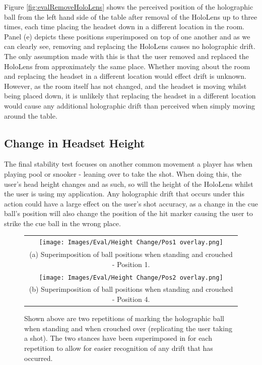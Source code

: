 \documentclass[ %
                author={Finn Alexander Wilkinson},
                supervisor={Dr. Andrew Calway},
                degree={MEng},
                title={\centering A Mixed Reality Aim Assistant for Pool and Snooker},
                subtitle={},
                type={Enterprise},
                year={2021} ]{dissertation}
\begin{document}
Figure \ref{fig:evalRemoveHoloLens} shows the perceived position of the holographic ball from the left hand side of the table after removal of the HoloLens up to three times, each time placing the headset down in a different location in the room. Panel (e) depicts these positions superimposed on top of one another and as we can clearly see, removing and replacing the HoloLens causes no holographic drift. The only assumption made with this is that the user removed and replaced the HoloLens from approximately the same place. Whether moving about the room and replacing the headset in a different location would effect drift is unknown. However, as the room itself has not changed, and the headset is moving whilst being placed down, it is unlikely that replacing the headset in a different location would cause any additional holographic drift than perceived when simply moving around the table.


\subsection{Change in Headset Height}
The final stability test focuses on another common movement a player has when playing pool or snooker - leaning over to take the shot. When doing this, the user's head height changes and as such, so will the height of the HoloLens whilst the user is using my application. Any holographic drift that occurs under this action could have a large effect on the user's shot accuracy, as a change in the cue ball's position will also change the position of the hit marker causing the user to strike the cue ball in the wrong place. 

\begin{figure}[h!]
    \centering
    \begin{tabular}{c}
         \texttt{[image: Images/Eval/Height Change/Pos1 overlay.png]}\\
         (a) Superimposition of ball positions when standing and crouched - Position 1. \\[6pt]
         \texttt{[image: Images/Eval/Height Change/Pos2 overlay.png]} \\
         (b) Superimposition of ball positions when standing and crouched - Position 4. \\[6pt]
    \end{tabular}
    \caption{Shown above are two repetitions of marking the holographic ball when standing and when crouched over (replicating the user taking a shot). The two stances have been superimposed in for each repetition to allow for easier recognition of any drift that has occurred.}
    \label{fig:evalHeadsetHeight}
\end{figure}
\end{document}

